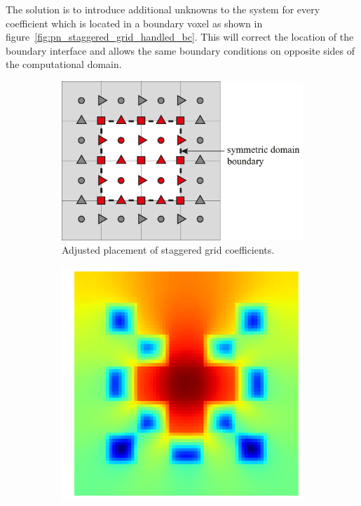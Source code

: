 The solution is to introduce additional unknowns to the system for every coefficient which is located in a boundary voxel as shown in figure~\ref{fig:pn_staggered_grid_handled_bc}. This will correct the location of the boundary interface and allows the same boundary conditions on opposite sides of the computational domain.
\begin{figure}[h]
\centering
\begin{subfigure}[t]{0.49\columnwidth}
\centering
\includegraphics[width=1\textwidth]{04_pn_method/figures/fig_staggered_grid_domain_boundary_corrected.pdf}
\caption{Adjusted placement of staggered grid coefficients.}
\label{fig:pn_staggering_correct_bc}
\end{subfigure}
\hspace{0.01\columnwidth}
\begin{subfigure}[t]{0.34\columnwidth}
\centering
\includegraphics[width=\columnwidth]{04_pn_method/results/checkerboard2d_p5_neumann_staggered.png}

\end{subfigure}
\end{figure}
